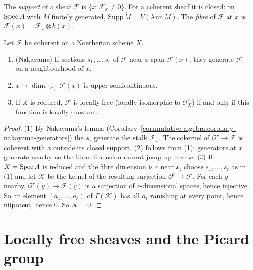 \begin{definition}\label{coherent-sheaves:definition-support}
The \emph{support} of a sheaf $\mathcal{F}$ is $\{x : \mathcal{F}_x \neq 0\}$. For a coherent sheaf it is closed: on $\operatorname{Spec} A$ with $M$ finitely generated,
$\mathrm{Supp}\,\widetilde M = V(\mathrm{Ann}\,M)$. The \emph{fibre} of $\mathcal{F}$ at $x$ is $\mathcal{F}(x) = \mathcal{F}_x \otimes k(x)$.
\end{definition}

\begin{proposition}\label{coherent-sheaves:proposition-fibre-dimension}
Let $\mathcal{F}$ be coherent on a Noetherian scheme $X$.
\begin{enumerate}
\item (Nakayama) If sections $s_1, \ldots, s_r$ of $\mathcal{F}$ near $x$ span $\mathcal{F}(x)$, they generate $\mathcal{F}$ on a neighbourhood of $x$.
\item $x \mapsto \dim_{k(x)}\mathcal{F}(x)$ is upper semicontinuous.
\item If $X$ is reduced, $\mathcal{F}$ is locally free (locally isomorphic to $\mathcal{O}_X^r$) if and only if this function is locally constant.
\end{enumerate}
\end{proposition}

\begin{proof}
(1) By Nakayama's lemma (Corollary~\ref{commutative-algebra:corollary-nakayama-generators}) the $s_i$ generate the stalk $\mathcal{F}_x$. The cokernel of
$\mathcal{O}^r \to \mathcal{F}$ is coherent with $x$ outside its closed support. (2) follows from (1): generators at $x$ generate nearby, so the
fibre dimension cannot jump up near $x$. (3) If $X = \operatorname{Spec} A$ is reduced and the fibre dimension is $r$ near $x$, choose $s_1, \ldots, s_r$ as in (1) and
let $\mathcal{K}$ be the kernel of the resulting surjection $\mathcal{O}^r \to \mathcal{F}$. For each $y$ nearby, $\mathcal{O}^r(y) \to \mathcal{F}(y)$ is a
surjection of $r$-dimensional spaces, hence injective. So an element $(a_1, \ldots, a_r)$ of $\Gamma(\mathcal{K})$ has all $a_i$ vanishing at every point,
hence nilpotent, hence $0$. So $\mathcal{K} = 0$.
\end{proof}

\section{Locally free sheaves and the Picard group}\label{coherent-sheaves:section-locally-free}

